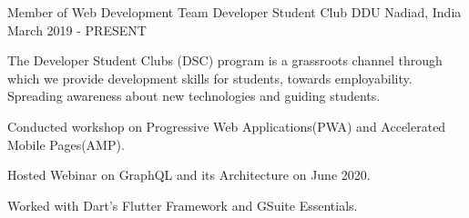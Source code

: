 
\begin{cventries}
  \cventry
    {Member of Web Development Team} %
    {Developer Student Club DDU} %
    {Nadiad, India} %
    {March 2019 - PRESENT} %
    {
      \begin{cvitems} %
        \item {The Developer Student Clubs (DSC) program is a grassroots channel through which we provide development skills for students, towards employability. Spreading awareness about new technologies and guiding students.}
        \item{Conducted workshop on Progressive Web Applications(PWA) and Accelerated Mobile Pages(AMP).}
        \item{Hosted Webinar on GraphQL and its Architecture on June 2020.}
        \item{Worked with Dart's Flutter Framework and GSuite Essentials.}
      \end{cvitems}
    }

    
\end{cventries}
